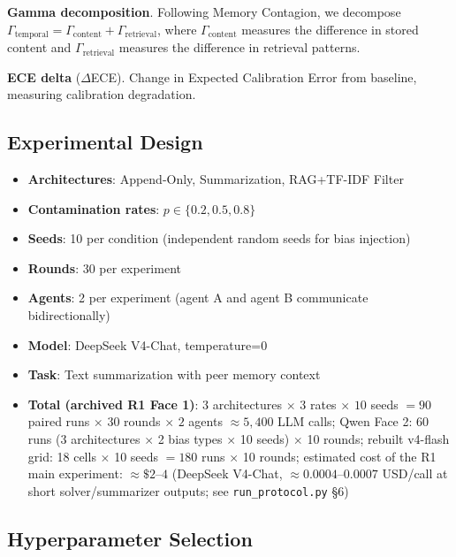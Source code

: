 \documentclass[11pt]{article}
\begin{document}
\textbf{Gamma decomposition}. Following Memory Contagion, we decompose $\Gamma_{\text{temporal}} = \Gamma_{\text{content}} + \Gamma_{\text{retrieval}}$, where $\Gamma_{\text{content}}$ measures the difference in stored content and $\Gamma_{\text{retrieval}}$ measures the difference in retrieval patterns.

\textbf{ECE delta} ($\Delta$ECE). Change in Expected Calibration Error from baseline, measuring calibration degradation.

\subsection{Experimental Design}

\begin{itemize}[nosep]
    \item \textbf{Architectures}: Append-Only, Summarization, RAG+TF-IDF Filter
    \item \textbf{Contamination rates}: $p \in \{0.2, 0.5, 0.8\}$
    \item \textbf{Seeds}: 10 per condition (independent random seeds for bias injection)
    \item \textbf{Rounds}: 30 per experiment
    \item \textbf{Agents}: 2 per experiment (agent A and agent B communicate bidirectionally)
    \item \textbf{Model}: DeepSeek V4-Chat, temperature=0
    \item \textbf{Task}: Text summarization with peer memory context
    \item \textbf{Total (archived R1 Face 1)}: $3$ architectures $\times$ $3$ rates $\times$ $10$ seeds $= 90$ paired runs $\times$ $30$ rounds $\times$ $2$ agents $\approx 5{,}400$ LLM calls; Qwen Face 2: 60 runs (3 architectures $\times$ 2 bias types $\times$ 10 seeds) $\times$ 10 rounds; rebuilt v4-flash grid: 18 cells $\times$ 10 seeds $= 180$ runs $\times$ 10 rounds; estimated cost of the R1 main experiment: $\approx \$2$--$4$ (DeepSeek V4-Chat, $\approx 0.0004$--$0.0007$ USD/call at short solver/summarizer outputs; see \texttt{run\_protocol.py} \S6)
\end{itemize}

\subsection{Hyperparameter Selection}
\label{sec:hyperparams}
\end{document}
